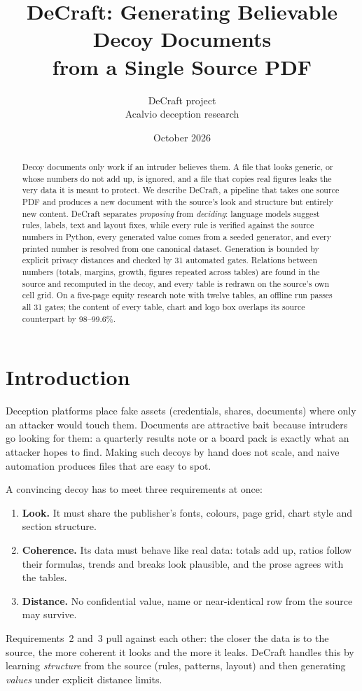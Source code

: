 \documentclass[10pt,twocolumn]{article}
\title{\textbf{DeCraft: Generating Believable Decoy Documents\\from a Single Source PDF}}
\author{DeCraft project\\\small Acalvio deception research}
\date{October 2026}
\begin{document}
\maketitle

\begin{abstract}
Decoy documents only work if an intruder believes them. A file that looks generic, or whose numbers
do not add up, is ignored, and a file that copies real figures leaks the very data it is meant to
protect. We describe DeCraft, a pipeline that takes one source PDF and produces a new document with
the source's look and structure but entirely new content. DeCraft separates \emph{proposing} from
\emph{deciding}: language models suggest rules, labels, text and layout fixes, while every rule is
verified against the source numbers in Python, every generated value comes from a seeded generator,
and every printed number is resolved from one canonical dataset. Generation is bounded by explicit
privacy distances and checked by 31 automated gates. Relations between numbers (totals, margins,
growth, figures repeated across tables) are found in the source and recomputed in the decoy, and
every table is redrawn on the source's own cell grid. On a five-page equity research note with
twelve tables, an offline run passes all 31 gates; the content of every table, chart and logo box
overlaps its source counterpart by 98--99.6\%.
\end{abstract}

\section{Introduction}

Deception platforms place fake assets (credentials, shares, documents) where only an attacker would
touch them. Documents are attractive bait because intruders go looking for them: a quarterly results
note or a board pack is exactly what an attacker hopes to find. Making such decoys by hand does not
scale, and naive automation produces files that are easy to spot.

A convincing decoy has to meet three requirements at once:
\begin{enumerate}
  \item \textbf{Look.} It must share the publisher's fonts, colours, page grid, chart style and
        section structure.
  \item \textbf{Coherence.} Its data must behave like real data: totals add up, ratios follow their
        formulas, trends and breaks look plausible, and the prose agrees with the tables.
  \item \textbf{Distance.} No confidential value, name or near-identical row from the source may
        survive.
\end{enumerate}
Requirements~2 and~3 pull against each other: the closer the data is to the source, the more
coherent it looks and the more it leaks. DeCraft handles this by learning \emph{structure} from the
source (rules, patterns, layout) and then generating \emph{values} under explicit distance limits.
\end{document}
